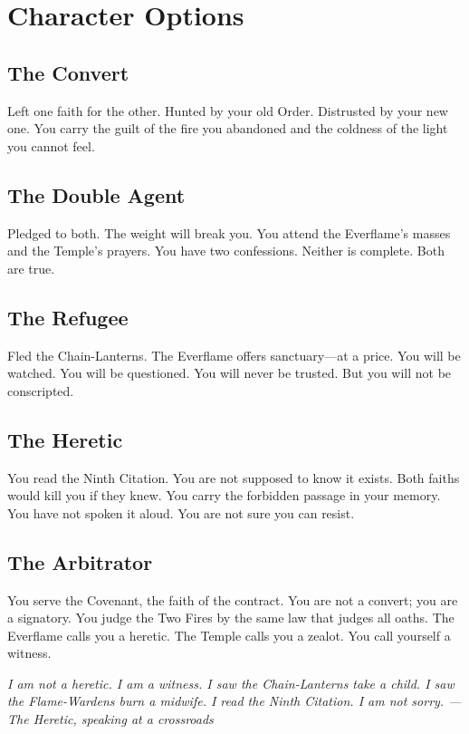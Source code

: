 \documentclass{book}
\newcommand{\citation}[1]{\textcolor{marginalia}{\small\textit{#1}}}
\begin{document}
\chapter{Character Options}

\section{The Convert}

Left one faith for the other. Hunted by your old Order. Distrusted by your new one. You carry the guilt of the fire you abandoned and the coldness of the light you cannot feel.

\section{The Double Agent}

Pledged to both. The weight will break you. You attend the Everflame's masses and the Temple's prayers. You have two confessions. Neither is complete. Both are true.

\section{The Refugee}

Fled the Chain-Lanterns. The Everflame offers sanctuary---at a price. You will be watched. You will be questioned. You will never be trusted. But you will not be conscripted.

\section{The Heretic}

You read the Ninth Citation. You are not supposed to know it exists. Both faiths would kill you if they knew. You carry the forbidden passage in your memory. You have not spoken it aloud. You are not sure you can resist.

\section{The Arbitrator}

You serve the Covenant, the faith of the contract. You are not a convert; you are a signatory. You judge the Two Fires by the same law that judges all oaths. The Everflame calls you a heretic. The Temple calls you a zealot. You call yourself a witness.

\citation{I am not a heretic. I am a witness. I saw the Chain-Lanterns take a child. I saw the Flame-Wardens burn a midwife. I read the Ninth Citation. I am not sorry. --- The Heretic, speaking at a crossroads}
\end{document}
